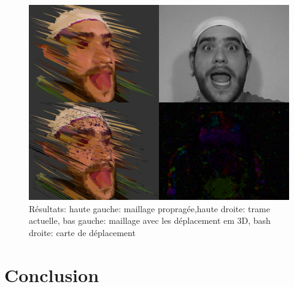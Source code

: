 \documentclass[a4paper,12pt]{article}
\begin{document}
 
\begin{figure}[ht!]
  \begin{center}
    \includegraphics[scale=0.4]{img/frame10}
    \caption{Résultats: haute gauche: maillage propragée,haute droite:
      trame actuelle, bas gauche: maillage avec les déplacement em 3D,
      bash droite: carte de déplacement }
    \label{fig:result}
  \end{center}
\end{figure}

\newpage
\section{Conclusion}


% 
% 
\end{document}
